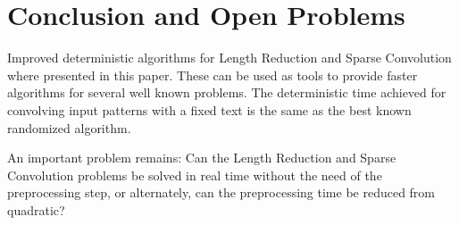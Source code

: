\documentclass[11pt,amssymb]{article}
\begin{document}
\section{Conclusion and Open Problems}\label{s:conc}

Improved deterministic algorithms for Length Reduction and Sparse
Convolution where presented in this paper. These can be used as
tools to provide faster algorithms for several well known problems.
The deterministic time achieved for convolving input patterns with a
fixed text is the same as the best known randomized algorithm.

An important problem remains: Can the Length Reduction and Sparse
Convolution problems be solved in real time without the need of the
preprocessing step, or alternately, can the preprocessing time be
reduced from quadratic?


\small{

}
\end{document}
